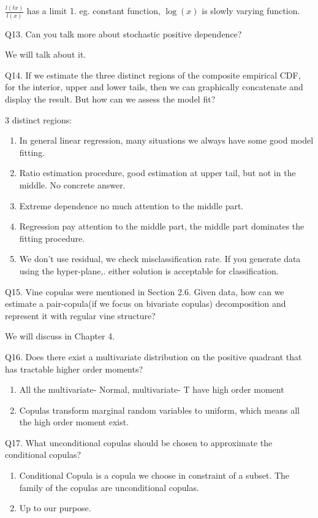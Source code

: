 \documentclass[a4paper,12pt]{texMemo}
\begin{document}
$\frac{l(tx)}{l(x)}$ has a limit 1. eg. constant function, $\log(x)$ is slowly varying function. 

Q13. Can you talk more about stochastic positive dependence?

We will talk about it. 

Q14. If we estimate the three distinct regions of the composite empirical CDF, for the interior, upper and lower tails, then we can graphically concatenate and display the result. But how can we assess the model fit?

3 distinct regions:
\begin{enumerate}
\item In general linear regression, many situations we always have some good model fitting. 
\item Ratio estimation procedure, good estimation at upper tail, but not in the middle. No concrete answer.
\item Extreme dependence no much attention to the middle part.
\item Regression pay attention to the middle part, the middle part dominates the fitting procedure. 
\item We don't use residual, we check misclassification rate. 
If you generate data using the hyper-plane,. either solution is acceptable for classification. 
\end{enumerate}

Q15. Vine copulas were mentioned in Section 2.6. Given data, how can we estimate a pair-copula(if we focus on bivariate copulas) decomposition and represent it with regular vine structure?

We will discuss in Chapter 4.

Q16. Does there exist a multivariate distribution on the positive quadrant that has tractable higher order moments? 

\begin{enumerate}
\item All the multivariate- Normal, multivariate- T have high order moment
\item Copulas transform marginal random variables to uniform, which means all the high order moment exist.
\end{enumerate}

Q17. What unconditional copulas should be chosen to approximate the conditional copulas?

\begin{enumerate}
\item Conditional Copula is a copula we choose in constraint of a subset. The family of the copulas are unconditional copulas. 
\item Up to our purpose.
\end{enumerate}
\end{document}
